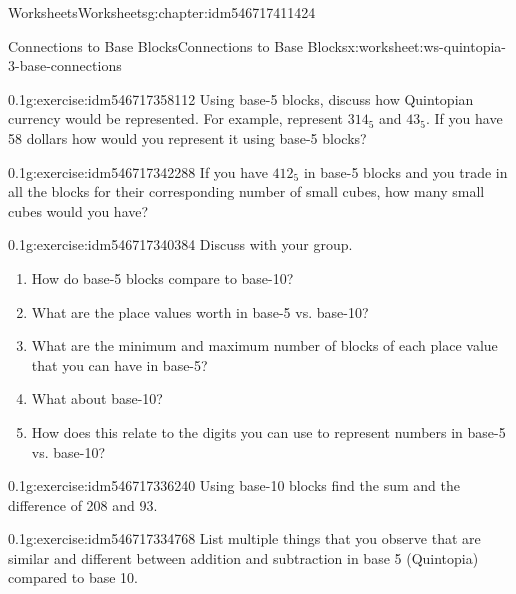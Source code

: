 \documentclass[twoside,11pt,]{book}
\begin{document}
\begin{chapterptx}{Worksheets}{}{Worksheets}{}{}{g:chapter:idm546717411424}
\restoregeometry
%
%
\typeout{************************************************}
\typeout{************************************************}
%
\begin{worksheet-section-numberless}{Connections to Base Blocks}{}{Connections to Base Blocks}{}{}{x:worksheet:ws-quintopia-3-base-connections}
\begin{divisionexercise}{1}{}{0.1}{g:exercise:idm546717358112}%
Using base-5 blocks, discuss how Quintopian currency would be represented. For example, represent \(314_{5}\) and \(43_{5}\). If you have \textdollar{}58 dollars how would you represent it using base-5 blocks?%
\end{divisionexercise}%
\begin{divisionexercise}{2}{}{0.1}{g:exercise:idm546717342288}%
If you have \(412_{5}\) in base-5 blocks and you trade in all the blocks for their corresponding number of small cubes, how many small cubes would you have?%
\end{divisionexercise}%
\begin{divisionexercise}{3}{}{0.1}{g:exercise:idm546717340384}%
Discuss with your group.%
%
\begin{enumerate}[label=(\alph*)]
\item{}How do base-5 blocks compare to base-10?%
\item{}What are the place values worth in base-5 vs. base-10?%
\item{}What are the minimum and maximum number of blocks of each place value that you can have in base-5?%
\item{}What about base-10?%
\item{}How does this relate to the digits you can use to represent numbers in base-5 vs. base-10?%
\end{enumerate}
\end{divisionexercise}%
\begin{divisionexercise}{4}{}{0.1}{g:exercise:idm546717336240}%
Using base-10 blocks find the sum and the difference of 208 and 93.%
\end{divisionexercise}%
\begin{divisionexercise}{5}{}{0.1}{g:exercise:idm546717334768}%
List multiple things that you observe that are similar and different between addition and subtraction in base 5 (Quintopia) compared to base 10.%
\end{divisionexercise}%
\end{worksheet-section-numberless}

\end{chapterptx}
\end{document}
